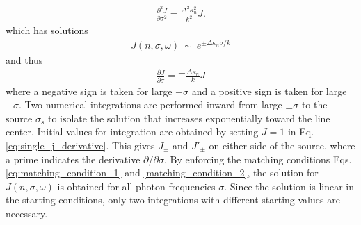 \documentclass{aastex63}
\newcommand{\be}{\begin{eqnarray}}
\newcommand{\ee}{\end{eqnarray}}
\begin{document}
\be \label{eq:diffusion_at_large_sigma}
\frac{\partial^2J}{\partial\sigma^2} = \frac{\Delta^2\kappa_n^2}{k^2} J.
\ee
which has solutions 
\be
J(n, \sigma, \omega)\ {\sim}\ e^{\pm \Delta \kappa_n \sigma / k}
\ee
and thus
\be \label{eq:single_j_derivative}
\frac{\partial J}{\partial \sigma} = \mp \frac{\Delta\kappa_n}{k} J
\ee
where a negative sign is taken for large $+\sigma$ and a positive sign is taken for large $-\sigma$. Two numerical integrations are performed inward from large $\pm \sigma$ to the source $\sigma_s$ to isolate the solution that increases exponentially toward the line center. Initial values for integration are obtained by setting $J=1$ in Eq. \ref{eq:single_j_derivative}. This gives $J_\pm$ and $J'_\pm$ on either side of the source, where a prime indicates the derivative $\partial/\partial \sigma$. By enforcing the matching conditions Eqs. \ref{eq:matching_condition_1} and \ref{matching_condition_2}, the solution for $J(n, \sigma, \omega)$ is obtained for all photon frequencies $\sigma$. Since the solution is linear in the starting conditions, only two integrations with different starting values are necessary.
\end{document}

